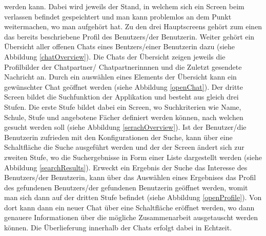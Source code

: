 \documentclass[../main.tex]{subfiles}
\begin{document}
werden kann. Dabei wird jeweils der Stand, in welchem sich ein Screen beim verlassen befindet gespeichtert und man kann problemlos an dem Punkt weitermachen, wo man aufgehört hat. Zu den drei Hauptscreens gehört zum einen das bereits beschriebene Profil des Benutzers/der Benutzerin. Weiter gehört ein Übersicht aller offenen Chats eines Bentzers/einer Benutzerin dazu (siehe Abbildung \ref{chatOverview}). Die Chats der Übersicht zeigen jeweils die Profilbilder der Chatpartner/ Chatpartnerinnnen und die Zuletzt gesendete Nachricht an. Durch ein auswählen eines Elements der Übersicht kann ein gewünschter Chat geöffnet werden (siehe Abbildung \ref{openChat}). Der dritte Screen bildet die Suchfunktion der Applikation und besteht aus gleich drei Stufen. Die erste Stufe bildet dabei ein Screen, wo Suchkriterien wie Name, Schule, Stufe und angebotene Fächer definiert werden können, nach welchen gesucht werden soll (siehe Abbildung \ref{serachOverview}). Ist der Benutzer/die Benutzerin zufrieden mit den Konfigurationen der Suche, kann über eine Schaltfläche die Suche ausgeführt werden und der der Screen ändert sich zur zweiten Stufe, wo die Suchergebnisse in Form einer Liste dargestellt werden (siehe Abbildung \ref{searchResults}). Erweckt ein Ergebnis der Suche das Interesse des Benutzers/der Benutzerin, kann über das Auswählen eines Ergebnises das Profil des gefundenen Benutzers/der gefundenen Benutzerin geöffnet werden, womit man sich dann auf der dritten Stufe befindet (siehe Abbildung  \ref{openProfile}). Von dort kann dann ein neuer Chat über eine Schaltfläche eröffnet werden, wo dann genauere Informationen über die mögliche Zusammenarbeit ausgetauscht werden können. Die Überlieferung innerhalb der Chats erfolgt dabei in Echtzeit.
\end{document}
